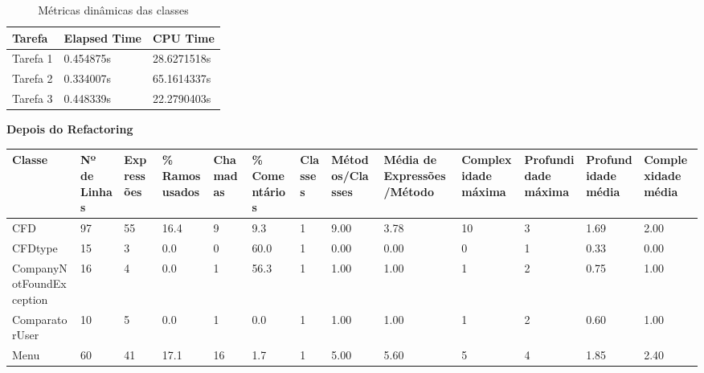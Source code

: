 \begin{table}[]
\centering
\begin{tabular}{|l|l|l|}
\hline
Tarefa   & Elapsed Time & CPU Time    \\ \hline
Tarefa 1 & 0.454875s    & 28.6271518s \\ \hline
Tarefa 2 & 0.334007s    & 65.1614337s \\ \hline
Tarefa 3 & 0.448339s    & 22.2790403s \\ \hline
\end{tabular}
\caption{Métricas dinâmicas das classes}
\end{table}

\newpage

\textbf{Depois do Refactoring}

\begin{table}[ht]
\centering
\begin{adjustbox}{width=1\textwidth}
\small
\begin{tabular}{|l|l|l|l|l|l|l|l|l|l|l|l|l|}
\hline
Classe                       & Nº de Linhas & Expressões & \% Ramos usados & Chamadas & \% Comentários & Classes & Métodos/Classes & Média de Expressões/Método & Complexidade máxima & Profundidade máxima & Profundidade média & Complexidade média \\ \hline
CFD                          & 97           & 55         & 16.4            & 9        & 9.3            & 1       & 9.00            & 3.78                       & 10                  & 3                   & 1.69               & 2.00               \\ \hline
CFDtype                      & 15           & 3          & 0.0             & 0        & 60.0           & 1       & 0.00            & 0.00                       & 0                   & 1                   & 0.33               & 0.00               \\ \hline
CompanyNotFoundException     & 16           & 4          & 0.0             & 1        & 56.3           & 1       & 1.00            & 1.00                       & 1                   & 2                   & 0.75               & 1.00               \\ \hline
ComparatorUser               & 10           & 5          & 0.0             & 1        & 0.0            & 1       & 1.00            & 1.00                       & 1                   & 2                   & 0.60               & 1.00               \\ \hline
Menu                         & 60           & 41         & 17.1            & 16       & 1.7            & 1       & 5.00            & 5.60                       & 5                   & 4                   & 1.85               & 2.40               \\ \hline

\end{tabular}
\end{adjustbox}
\end{table}
